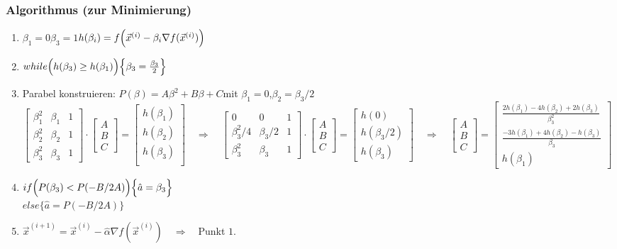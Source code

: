  \subsubsection{Algorithmus (zur Minimierung)}
 
 \begin{enumerate}
	\item $\beta_1=0$\quad$\beta_3=1$\qquad$h(\beta_i)=f\Bigl(\vec{x}^{(i)} - \beta_i \nabla f(\vec{x}^{(i)})\Bigr)$
	\item $while\Bigl(h(\beta_3)\geq h(\beta_1)\Bigl)\Bigl\{\beta_3=\frac{\beta_3}{2}\Bigr\}$
	\item Parabel konstruieren: $P(\beta)=A\beta^2+B\beta+C$\quad mit \quad $\beta_1=0$,\quad $\beta_2=\beta_3/2$\\
		$\begin{bmatrix}
		\beta_1^2 & \beta_1 & 1\\
		\beta_2^2 & \beta_2 & 1\\
		\beta_3^2 & \beta_3 & 1
		\end{bmatrix}\cdot\begin{bmatrix}A\\B\\C\end{bmatrix}=\begin{bmatrix}h(\beta_1)\\ h(\beta_2)\\ h(\beta_3)\\\end{bmatrix}\quad\Rightarrow\quad\begin{bmatrix}
		0 & 0 & 1\\
		\beta_3^2/4 & \beta_3/2 & 1\\
		\beta_3^2 & \beta_3 & 1
		\end{bmatrix}\cdot\begin{bmatrix}A\\B\\C\end{bmatrix}=\begin{bmatrix}h(0)\\ h(\beta_3/2)\\ h(\beta_3)\end{bmatrix}\quad\Rightarrow\quad
		\begin{bmatrix}A\\B\\C\end{bmatrix}=\begin{bmatrix}
		\frac{2h(\beta_1)-4h(\beta_2)+2h(\beta_3)}{\beta_3^2}\\[0.2cm]
		\frac{-3h(\beta_1)+4h(\beta_2)-h(\beta_3)}{\beta_3}\\[0.1cm]
		h(\beta_1)\end{bmatrix}$
  	\item $if\Bigl(P(\beta_3)<P(-B/2A)\Bigr)\Big\{\hat{a}=\beta_3\Big\}$\\
  	$else\Big\{\hat{a}=P(-B/2A)\Big\}$
  	\item $\vec{x}^{(i+1)} = \vec{x}^{(i)} - \hat{\alpha}\nabla f(\vec{x}^{(i)})\quad\Rightarrow\quad $Punkt $ 1.$
  	
  	
 \end{enumerate}
 
